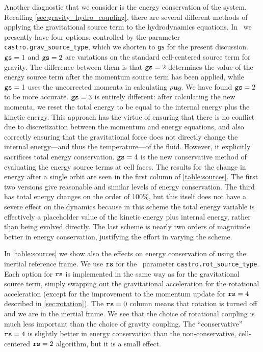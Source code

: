 \documentclass[12pt]{article}
\begin{document}
Another diagnostic that we consider is the energy conservation of the
system. Recalling \autoref{sec:gravity_hydro_coupling}, there are
several different methods of applying the gravitational source term to
the hydrodynamics equations. In \castro\ we presently have four
options, controlled by the parameter {\tt castro.grav\_source\_type},
which we shorten to {\tt gs} for the present discussion. 
${\tt gs} = 1$ and ${\tt gs} = 2$ are variations on the standard 
cell-centered source term for gravity. The difference between them is that 
${\tt gs} = 2$ determines the value of the energy source term after the momentum
source term has been applied, while ${\tt gs} = 1$ uses the uncorrected
momenta in calculating $\rho \mathbf{u} g$. We have found ${\tt gs} = 2$ to be
more accurate. ${\tt gs} = 3$ is entirely different: after calculating
the new momenta, we reset the total energy to be equal to the internal
energy plus the kinetic energy. This approach has the virtue of ensuring that
there is no conflict due to discretization between the momentum and
energy equations, and also correctly ensuring that the gravitational
force does not directly change the internal energy---and thus the
temperature---of the fluid. However, it explicitly sacrifices total
energy conservation. ${\tt gs} = 4$ is the new conservative method of
evaluating the energy source terms at cell faces. The results for the
change in energy after a single orbit are seen in the first column of
\autoref{table:sources}. The first two versions give reasonable and
similar levels of energy conservation. The third has total energy
changes on the order of 100\%, but this itself does not have a severe
effect on the dynamics because in this scheme the total energy
variable is effectively a placeholder value of the kinetic energy plus
internal energy, rather than being evolved directly. The last scheme
is nearly two orders of magnitude better in energy conservation,
justifying the effort in varying the scheme.

In \autoref{table:sources} we show also the effects on energy conservation of using the inertial reference frame. 
We use ${\tt rs}$ for the \castro\ parameter {\tt castro.rot\_source\_type}.
Each option for ${\tt rs}$ is implemented in the same way as for
the gravitational source term, simply swapping out the gravitational acceleration
for the rotational acceleration (except for the improvement to the momentum update
for ${\tt rs} = 4$ described in \autoref{sec:rotation}). 
The ${\tt rs} = 0$ column means that rotation is turned off and we are 
in the inertial frame. We see that the choice of rotational coupling is much less important than the choice of gravity coupling. 
The ``conservative'' ${\tt rs} = 4$ is slightly better in energy conservation than the non-conservative, 
cell-centered ${\tt rs} = 2$ algorithm, but it is a small effect.
\end{document}
